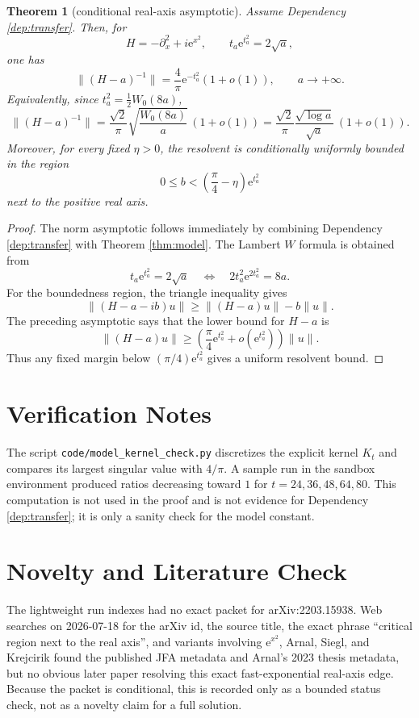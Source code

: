 \documentclass[11pt]{article}
\newtheorem{theorem}{Theorem}
\newcommand{\e}{\mathrm e}
\begin{document}
\begin{theorem}[conditional real-axis asymptotic]\label{thm:conditional}
Assume Dependency \ref{dep:transfer}.  Then, for
\[
    H=-\partial_x^2+i\e^{x^2},\qquad
    t_a\e^{t_a^2}=2\sqrt a,
\]
one has
\[
    \|(H-a)^{-1}\|=\frac{4}{\pi}\e^{-t_a^2}(1+o(1)),
    \qquad a\to+\infty.
\]
Equivalently, since \(t_a^2=\frac12 W_0(8a)\),
\[
    \|(H-a)^{-1}\|
    =\frac{\sqrt2}{\pi}\sqrt{\frac{W_0(8a)}{a}}\,(1+o(1))
    =\frac{\sqrt2}{\pi}\frac{\sqrt{\log a}}{\sqrt a}\,(1+o(1)).
\]
Moreover, for every fixed \(\eta>0\), the resolvent is conditionally uniformly
bounded in the region
\[
    0\le b<\left(\frac{\pi}{4}-\eta\right)\e^{t_a^2}
\]
next to the positive real axis.
\end{theorem}

\begin{proof}
The norm asymptotic follows immediately by combining Dependency
\ref{dep:transfer} with Theorem \ref{thm:model}.  The Lambert \(W\) formula is
obtained from
\[
    t_a\e^{t_a^2}=2\sqrt a
    \quad\Longleftrightarrow\quad
    2t_a^2\e^{2t_a^2}=8a.
\]
For the boundedness region, the triangle inequality gives
\[
    \|(H-a-ib)u\|\ge \|(H-a)u\|-b\|u\|.
\]
The preceding asymptotic says that the lower bound for \(H-a\) is
\[
    \|(H-a)u\|\ge \left(\frac{\pi}{4}\e^{t_a^2}+o(\e^{t_a^2})\right)\|u\|.
\]
Thus any fixed margin below \((\pi/4)\e^{t_a^2}\) gives a uniform resolvent
bound.
\end{proof}

\section*{Verification Notes}

The script \texttt{code/model\_kernel\_check.py} discretizes the explicit
kernel \(K_t\) and compares its largest singular value with \(4/\pi\).  A sample
run in the sandbox environment produced ratios decreasing toward \(1\) for
\(t=24,36,48,64,80\).  This computation is not used in the proof and is not
evidence for Dependency \ref{dep:transfer}; it is only a sanity check for the
model constant.

\section*{Novelty and Literature Check}

The lightweight run indexes had no exact packet for arXiv:2203.15938.  Web
searches on 2026-07-18 for the arXiv id, the source title, the exact phrase
``critical region next to the real axis'', and variants involving
\(\e^{x^2}\), Arnal, Siegl, and Krejcirik found the published JFA metadata and
Arnal's 2023 thesis metadata, but no obvious later paper resolving this exact
fast-exponential real-axis edge.  Because the packet is conditional, this is
recorded only as a bounded status check, not as a novelty claim for a full
solution.
\end{document}
